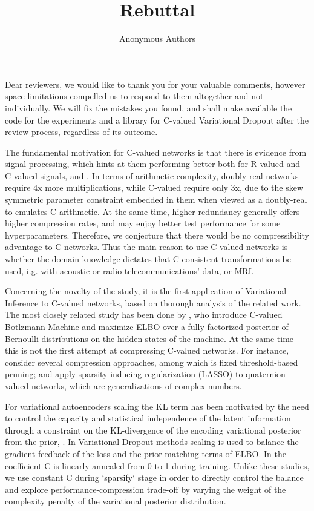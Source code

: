 \documentclass[10pt,a4paper,draft]{article}
\title{Rebuttal}
\author{Anonymous Authors}
\begin{document}

Dear reviewers, we would like to thank you for your valuable comments, however space
limitations compelled us to respond to them altogether and not individually. We will
fix the mistakes you found, and shall make available the code for the experiments and
a library for C-valued Variational Dropout after the review process, regardless of its
outcome.
\medskip

The fundamental motivation for C-valued networks is that there is evidence from signal
processing, which hints at them performing better both for R-valued and C-valued signals,
\cite{tarver_design_2019,sivachitra_planning_2015} and \cite{hu_initial_2016}. In terms
of arithmetic complexity, doubly-real networks require 4x more multiplications, while
C-valued require only 3x, due to the skew symmetric parameter constraint embedded in them
when viewed as a doubly-real to emulates C arithmetic. At the same time, higher redundancy
generally offers higher compression rates, and may enjoy better test performance for some
hyperparameters. Therefore, we conjecture that there would be no compressibility advantage
to C-networks. Thus the main reason to use C-valued networks is whether the domain knowledge
dictates that C-consistent transformations be used, i.g. with acoustic or radio
telecommunications' data, or MRI.

Concerning the novelty of the study, it is the first application of Variational Inference
to C-valued networks, based on thorough analysis of the related work. The most closely
related study has been done by \cite{popa_complex-valued_2018}, who introduce C-valued Botlzmann
Machine and maximize ELBO over a fully-factorized posterior of Bernoulli distributions on
the hidden states of the machine. At the same time this is not the first attempt at compressing
C-valued networks. For instance, \cite{wu_compressing_2019} consider several compression
approaches, among which is fixed threshold-based pruning; and \cite{vecchi_compressing_2020}
apply sparsity-inducing regularization (LASSO) to quaternion-valued networks, which are
generalizations of complex numbers.

For variational autoencoders scaling the KL term has been motivated by the need to control
the capacity and statistical independence of the latent information through a constraint on
the KL-divergence of the encoding variational posterior from the prior, \cite{higgins_beta-vae_2017}.
In Variational Dropout methods scaling is used to balance the gradient feedback of the loss
and the prior-matching terms of ELBO. In \cite{molchanov_variational_2017,kharitonov_variational_2018,gale_state_2019}
the coefficient C is linearly annealed from 0 to 1 during training. Unlike these studies,
we use constant C during `sparsify` stage in order to directly control the balance and explore
performance-compression trade-off by varying the weight of the complexity penalty of the
variational posterior distribution.
\end{document}
